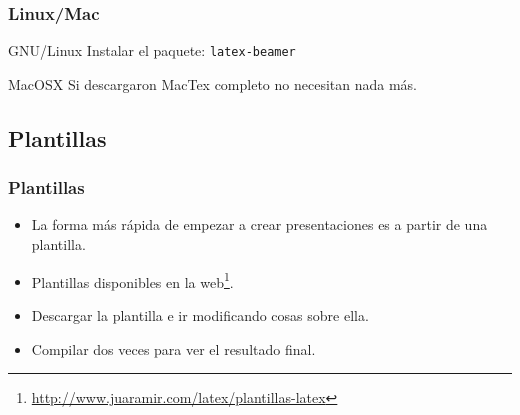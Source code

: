 \documentclass[aspectratio=1610]{beamer}%
\begin{document}
\begin{frame}[fragile]
\frametitle{\textbf{Linux/Mac}}
\justifying
 \begin{block}{GNU/Linux}
Instalar el paquete: \texttt{latex-beamer}
\end{block}
\begin{block}{MacOSX}
Si descargaron MacTex completo no necesitan nada más.
\end{block}

\end{frame}
\subsection{Plantillas}
\begin{frame}[fragile]
\frametitle{\textbf{Plantillas}}
\justifying
 \begin{itemize}\justifying
  \item La forma más rápida de empezar a crear presentaciones es a partir de una plantilla.
  \item Plantillas disponibles en la web\footnote{\url{http://www.juaramir.com/latex/plantillas-latex}}.
  \item Descargar la plantilla e ir modificando cosas sobre ella.
  \item Compilar dos veces para ver el resultado final.
\end{itemize}

\end{frame}
\end{document}
